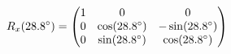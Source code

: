 \documentclass[preview]{standalone}
\begin{document}
\begin{align*}
\special{dvisvgm:raw <g id='unique000'>}R_x(28.8^\circ) = \begin{pmatrix} 1 & 0 & 0 \\ 0 & \cos(28.8^\circ) & -\sin(28.8^\circ) \\ 0 & \sin(28.8^\circ) & \cos(28.8^\circ) \end{pmatrix}\special{dvisvgm:raw </g>}
\end{align*}
\end{document}
